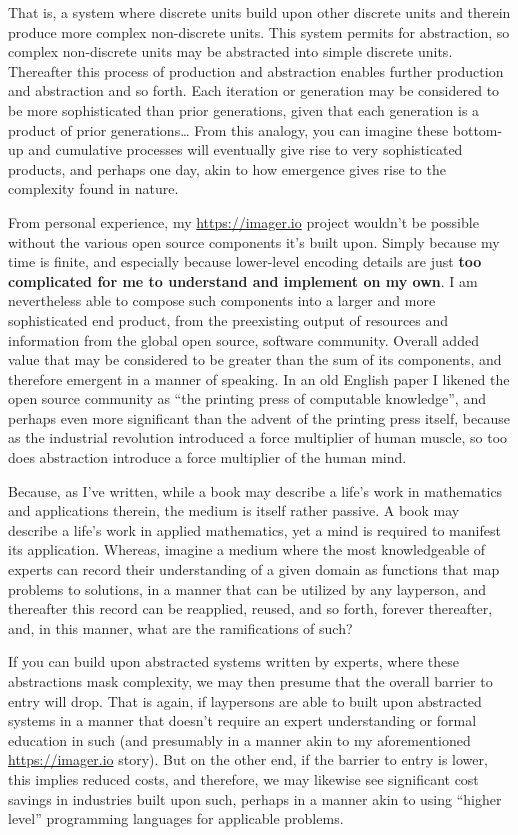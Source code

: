 That is, a system where discrete units build upon other discrete units and therein produce more complex non-discrete units. This system permits for abstraction, so complex non-discrete units may be abstracted into simple discrete units. Thereafter this process of production and abstraction enables further production and abstraction and so forth. Each iteration or generation may be considered to be more sophisticated than prior generations, given that each generation is a product of prior generations… From this analogy, you can imagine these bottom-up and cumulative processes will eventually give rise to very sophisticated products, and perhaps one day, akin to how emergence gives rise to the complexity found in nature.

From personal experience, my \url{https://imager.io} project wouldn’t be possible without the various open source components it’s built upon. Simply because my time is finite, and especially because lower-level encoding details are just \textbf{too complicated for me to understand and implement on my own}. I am nevertheless able to compose such components into a larger and more sophisticated end product, from the preexisting output of resources and information from the global open source, software community. Overall added value that may be considered to be greater than the sum of its components, and therefore emergent in a manner of speaking. In an old English paper I likened the open source community as ``the printing press of computable knowledge'', and perhaps even more significant than the advent of the printing press itself, because as the industrial revolution introduced a force multiplier of human muscle, so too does abstraction introduce a force multiplier of the human mind.

Because, as I've written, while a book may describe a life’s work in mathematics and applications therein, the medium is itself rather passive. A book may describe a life’s work in applied mathematics, yet a mind is required to manifest its application. Whereas, imagine a medium where the most knowledgeable of experts can record their understanding of a given domain as functions that map problems to solutions, in a manner that can be utilized by any layperson, and thereafter this record can be reapplied, reused, and so forth, forever thereafter, and, in this manner, what are the ramifications of such?

If you can build upon abstracted systems written by experts, where these abstractions mask complexity, we may then presume that the overall barrier to entry will drop. That is again, if laypersons are able to built upon abstracted systems in a manner that doesn't require an expert understanding or formal education in such (and presumably in a manner akin to my aforementioned \url{https://imager.io} story). But on the other end, if the barrier to entry is lower, this implies reduced costs, and therefore, we may likewise see significant cost savings in industries built upon such, perhaps in a manner akin to using ``higher level'' programming languages for applicable problems. 


